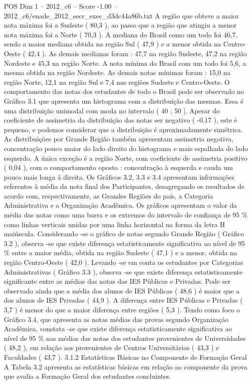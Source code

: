 \begin{textsample}{POS Dim 1 – 2012\_c6 – Score -1.00 – 2012\_c6/enade\_2012\_secr\_exec\_d3dc44a86b.txt}
A região que obteve a maior nota máxima foi a Sudeste ( 80,3 ), ao passo que a região que atingiu a menor nota máxima foi a Norte ( 70,3 ).
A mediana do Brasil como um todo foi 46,7, sendo a maior mediana obtida na região Sul ( 47,9 ) e a menor obtida na Centro-Oeste ( 42,4 ).
As demais medianas foram : 47,7 na região Sudeste, 47,2 na região Nordeste e 45,3 na região Norte.
A nota mínima do Brasil com um todo foi 5,6, a mesma obtida na região Nordeste.
As demais notas mínimas foram : 15,0 na região Norte, 12,1 na região Sul e 7,4 nas regiões Sudeste e Centro-Oeste.
O comportamento das notas dos estudantes de todo o Brasil pode ser observado no Gráfico 3.1 que apresenta um histograma com a distribuição das mesmas.
Essa é uma distribuição unimodal com moda no intervalo ( 40 ; 50 ].
Apesar do coeficiente de assimetria da distribuição das notas ser negativo ( -0,17 ), este é pequeno, e podemos considerar que a distribuição é aproximadamente simétrica.
As distribuições por Grande Região também apresentam assimetria negativa, concentração pouco maior do lado direito do histograma e mais espalhada do lado esquerdo.
A única exceção é a região Norte, com coeficiente de assimetria positivo ( 0,04 ), com o comportamento oposto : concentração à esquerda e cauda um pouco mais longa à direita.
Os Gráficos 3.2, 3.3 e 3.4 apresentam informações referentes à média da nota final dos Participantes, desagregando os resultados de acordo com, respectivamente, as Grandes Regiões do país, a Categoria Administrativa e a Organização Acadêmica.
Os gráficos apresentam o valor da média das notas como uma barra e os extremos do intervalo de confiança de 95 \% como linhas verticais unidas por uma linha horizontal na forma da letra H maiúscula.
Considerando -se o gráfico de notas segundo Grande Região ( Gráfico 3.2 ), observa -se que existe diferença estatisticamente significativa ao nível de 95 \% entre a maior média, obtida na região Sudeste ( 47,1 ) e a menor, obtida na região Centro-Oeste ( 42,0 ).
Levando -se em conta os estudantes por Categorias Administrativas ( Gráfico 3.3 ), observa -se que existe diferença estatisticamente significante entre as médias das notas das IES Públicas e Privadas.
Pode ser observado ainda que a média dos alunos de IES Públicas ( 48,6 ) é maior que a dos alunos de IES Privadas ( 44,9 ).
A diferença entre IES Públicas e Privadas ( 3,7 ) é menor do que a maior diferença entre regiões ( 5,3 ).
Tendo como foco o Gráfico 3.4, que apresenta as notas médias das provas segundo Organização Acadêmica, constata -se que existe diferença estatisticamente significativa ao nível de 95 \% nas médias das notas dos estudantes provenientes de Universidades ( 48,2 ), em relação aos provenientes de Centros Universitários ( 43,3 ) e Faculdades ( 43,7 ). 3.1.2 Estatísticas Básicas no Componente de Formação Geral A Tabela 3.2 apresenta as estatísticas básicas em relação ao componente da prova que avalia a Formação Geral dos estudantes concluintes.

\end{textsample}
